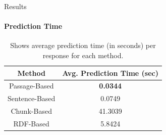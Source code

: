 \documentclass[aspectratio=169]{beamer}
\begin{document}
\begin{frame}{Results}
\framesubtitle{Prediction Time}
	\begin{table}
		\begin{center}
			\begin{tabular}{ |c|c| }
				\hline
				\textbf{Method} & \textbf{Avg. Prediction Time (sec)}
				\\ \hline
				Passage-Based & \textbf{0.0344}
				\\ \hline
				Sentence-Based & 0.0749
				\\ \hline
				Chunk-Based & 41.3039
				\\ \hline
				RDF-Based & 5.8424
				\\ \hline
				
			\end{tabular}
			\caption{Shows average prediction time (in seconds) per response for each method.}
			\label{table:prediction time}
		\end{center}
	\end{table}
\end{frame}
%
%
%
\end{document}
